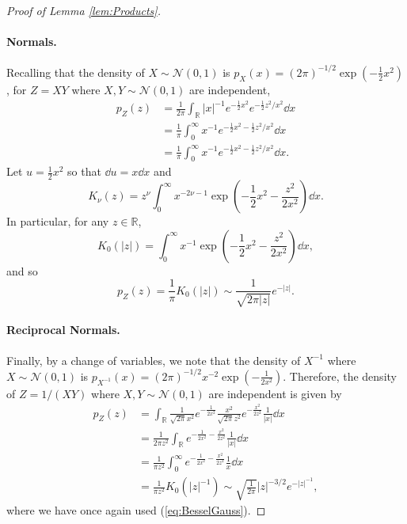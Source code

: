 \documentclass[../thesis.tex]{subfiles}
\begin{document}
\begin{proof}[Proof of Lemma \ref{lem:Products}]
  \paragraph{Normals.} Recalling that the density of $X \sim \mathcal{N}(0,1)$ is $p_X(x) = (2\pi)^{-1/2} \exp(-\frac12 x^2)$, for $Z = XY$ where $X,Y \sim \mathcal{N}(0,1)$ are independent,
  \begin{align*}
    p_Z(z) & = \frac{1}{2\pi}\int_{\mathbb{R}}\left|x\right|^{-1}e^{-\frac{1}{2}x^{2}}e^{-\frac{1}{2}z^{2}/x^{2}}\dd x \\
           & =\frac{1}{\pi}\int_{0}^{\infty}x^{-1}e^{-\frac{1}{2}x^{2}-\frac{1}{2}z^{2}/x^{2}}\dd x                    \\
           & =\frac{1}{\pi}\int_{0}^{\infty}x^{-1}e^{-\frac{1}{2}x^{2}-\frac{1}{2}z^{2}/x^{2}}\dd x.
  \end{align*}
  Let $u=\frac{1}{2}x^{2}$ so that $\dd u=x \dd x$ and
  \[
    K_{\nu}(z)=z^{\nu}\int_{0}^{\infty}x^{-2\nu-1}\exp\left(-\frac{1}{2}x^{2}-\frac{z^{2}}{2x^{2}}\right)\dd x.
  \]
  In particular, for any $z \in \mathbb{R}$,
  \begin{equation}
    \label{eq:BesselGauss}
    K_{0}(|z|)=\int_{0}^{\infty}x^{-1}\exp\left(-\frac{1}{2}x^{2}-\frac{z^{2}}{2x^{2}}\right)\dd x,
  \end{equation}
  and so
  \[
    p_Z(z) = \frac{1}{\pi} K_0(|z|) \sim \frac{1}{\sqrt{2\pi|z|}} e^{-|z|}.
  \]
  \paragraph{Reciprocal Normals.} Finally, by a change of variables, we note that the density of $X^{-1}$ where $X \sim \mathcal{N}(0,1)$ is $p_{X^{-1}}(x) = (2\pi)^{-1/2} x^{-2}\exp(-\frac{1}{2x^2})$. Therefore, the density of $Z = 1/(XY)$ where $X,Y \sim \mathcal{N}(0,1)$ are independent is given by
  \begin{align*}
    p_{Z}(z) & =\int_{\mathbb{R}}\frac{1}{\sqrt{2\pi}x^{2}}e^{-\frac{1}{2x^{2}}}\frac{x^{2}}{\sqrt{2\pi}z^{2}}e^{-\frac{x^{2}}{2z^{2}}}\frac{1}{\left|x\right|}\dd x \\
             & =\frac{1}{2\pi z^{2}}\int_{\mathbb{R}}e^{-\frac{1}{2x^{2}}-\frac{x^{2}}{2z^{2}}}\frac{1}{\left|x\right|}\dd x                                         \\
             & =\frac{1}{\pi z^{2}}\int_{0}^{\infty}e^{-\frac{1}{2x^{2}}-\frac{x^{2}}{2z^{2}}}\frac{1}{x}\dd x                                                       \\
             & =\frac{1}{\pi z^{2}}K_{0}(|z|^{-1}) \sim \sqrt{\frac{1}{2\pi}}|z|^{-3/2}e^{-|z|^{-1}},
  \end{align*}
  where we have once again used (\ref{eq:BesselGauss}).
\end{proof}
\end{document}
